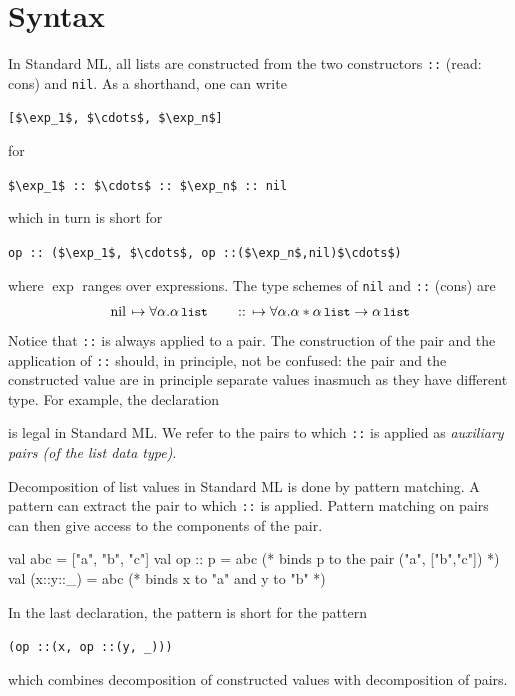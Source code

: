 \documentclass[12pt]{book}
\begin{document}
\section{Syntax}
\label{lsyn.sec}

In Standard ML, all lists are constructed from the two constructors
%
%
\lstinline{::} (read: cons) and
%
%
\lstinline{nil}.  As a shorthand, one can write
\begin{center}
  \lstinline![$\exp_1$, $\cdots$, $\exp_n$]!
\end{center}
for
\begin{center}
  \lstinline!$\exp_1$ :: $\cdots$ :: $\exp_n$ :: nil!
\end{center}
which in turn is short for
\begin{center}
  \lstinline!op :: ($\exp_1$, $\cdots$, op ::($\exp_n$,nil)$\cdots$)!
\end{center}
where $\exp$ ranges over expressions.  The type schemes of \lstinline{nil} and
\lstinline{::} (cons) are
$$
\mbox{\lstinline{nil}} \mapsto\forall\alpha.\alpha\,\kw{list}\qquad
\mbox{\lstinline{::}} \mapsto\forall\alpha.\alpha\ast\alpha\,\kw{list}\to\alpha\,\kw{list}
$$ Notice that \lstinline{::} is always applied to a pair. The construction of
the pair and the application of \lstinline{::} should, in principle, not be
confused: the pair and the constructed value are in principle separate values
inasmuch as they have different type.  For example, the declaration
is legal in Standard ML. We refer to the pairs to which \lstinline{::} is
applied as
%
%
{\em auxiliary pairs (of the list data type)}.

Decomposition of list values in Standard ML is done by
%
%
pattern matching.  A pattern can extract the pair to which \lstinline{::} is
applied. Pattern matching on pairs can then give access to the components of the
pair.
\begin{smlcode}
  val abc = ["a", "b", "c"]
  val op :: p = abc    (* binds p to the pair ("a", ["b","c"]) *)
  val (x::y::_) = abc  (* binds x to "a" and y to "b" *)
\end{smlcode}
In the last declaration, the pattern  is short for the pattern
\begin{center}
  \lstinline!(op ::(x, op ::(y, _)))!
\end{center}
which combines decomposition of constructed values with decomposition of pairs.
\end{document}
